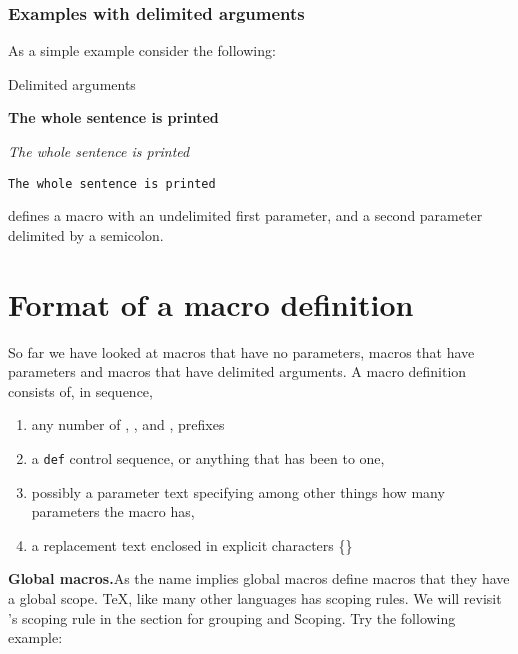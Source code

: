 \subsubsection{Examples with delimited arguments}

As a simple example consider the following:

\begin{texexample}{Delimited arguments}{}
\def\asentence#1#2;{{#1#2}}
\bye
\end{texexample}

\def\asentence#1#2;{{#1#2}}

{\asentence \bf The whole sentence is printed;}\par
{\asentence \it The whole sentence is printed;}\par
{\asentence \tt The whole sentence is printed;}\par



\noindent defines a macro with an undelimited first parameter, and a second parameter delimited by a
semicolon.

\section{Format of a macro definition}

So far we have looked at macros that have no parameters, macros that have parameters and macros that have delimited arguments. A macro definition consists of, in sequence,
\begin{enumerate}
\item any number of , , and , prefixes
\item a \texttt{def} control sequence, or anything that has been  to one,
\item possibly a parameter text specifying among other things how many parameters the macro has,
\item a replacement text enclosed in explicit characters \{\}
\end{enumerate}

\begin{multicols}{2}
\textbf{Global macros.}\quad As the name implies global macros define macros that they have a global scope. TeX, like many other languages has scoping rules. We will revisit \tex's scoping rule in the section for grouping and Scoping.  Try the following example:
\end{multicols}

